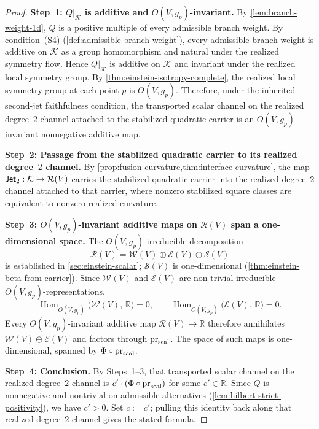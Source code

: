 \begin{proof}
\textbf{Step~1: $Q|_{\mathcal K}$ is additive and $O(V,g_p)$-invariant.}
By \cref{lem:branch-weight-1d}, $Q$ is a positive multiple of every
admissible branch weight.
By condition~\textup{(S4)} (\cref{def:admissible-branch-weight}), every
admissible branch weight is additive on $\mathcal K$ as a group
homomorphism and natural under the realized symmetry flow.
Hence $Q|_{\mathcal K}$ is additive on $\mathcal K$ and invariant under
the realized local symmetry group.
By \cref{thm:einstein-isotropy-complete}, the realized local symmetry
group at each point $p$ is $O(V,g_p)$.
Therefore, under the inherited second-jet faithfulness condition, the
transported scalar channel on the realized degree--\(2\) channel
attached to the stabilized quadratic carrier is an
$O(V,g_p)$-invariant nonnegative additive map.

\textbf{Step~2: Passage from the stabilized quadratic carrier to its realized degree--\(2\) channel.}
By \cref{prop:fusion-curvature,thm:interface-curvature}, the map
$\mathsf{Jet}_2 : \mathcal K \to \mathcal R(V)$ carries the stabilized
quadratic carrier into the realized degree--\(2\) channel attached to
that carrier, where nonzero stabilized square classes are equivalent
to nonzero realized curvature.

\textbf{Step~3: $O(V,g_p)$-invariant additive maps on $\mathcal R(V)$
span a one-dimensional space.}
The $O(V,g_p)$-irreducible decomposition
\[
  \mathcal R(V) = \mathcal W(V) \oplus \mathcal E(V) \oplus \mathcal S(V)
\]
is established in \cref{sec:einstein-scalar};
$\mathcal S(V)$ is one-dimensional (\cref{thm:einstein-beta-from-carrier}).
Since $\mathcal W(V)$ and $\mathcal E(V)$ are non-trivial irreducible
$O(V,g_p)$-representations,
\[
  \operatorname{Hom}_{O(V,g_p)}\!\bigl(\mathcal W(V),\,\mathbb R\bigr) = 0,
  \qquad
  \operatorname{Hom}_{O(V,g_p)}\!\bigl(\mathcal E(V),\,\mathbb R\bigr) = 0.
\]
Every $O(V,g_p)$-invariant additive map $\mathcal R(V) \to \mathbb R$
therefore annihilates $\mathcal W(V) \oplus \mathcal E(V)$ and factors
through $\operatorname{pr}_{\mathrm{scal}}$.
The space of such maps is one-dimensional, spanned by
$\Phi \circ \operatorname{pr}_{\mathrm{scal}}$.

\textbf{Step~4: Conclusion.}
By Steps~1--3, that transported scalar channel on the realized
degree--\(2\) channel is
$c' \cdot (\Phi \circ \operatorname{pr}_{\mathrm{scal}})$
for some $c' \in \mathbb R$.
Since $Q$ is nonnegative and nontrivial on admissible alternatives
(\cref{lem:hilbert-strict-positivity}), we have $c' > 0$.
Set $c := c'$; pulling this identity back along that realized
degree--\(2\) channel gives the stated formula.
\end{proof}

